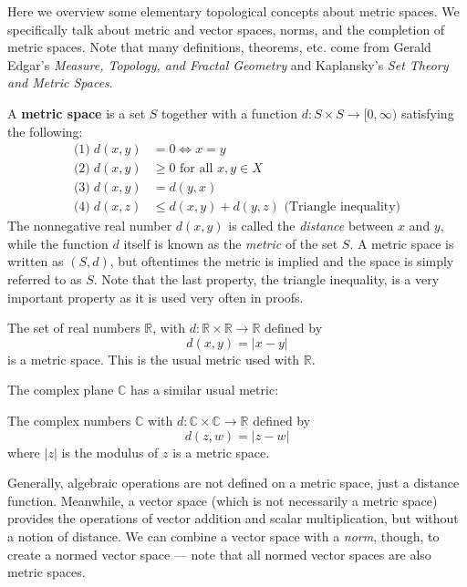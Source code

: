 Here we overview some elementary topological concepts about metric spaces.  We specifically talk about metric and vector spaces, norms, and the completion of metric spaces.  Note that many definitions, theorems, etc. come from Gerald Edgar's \textit{Measure, Topology, and Fractal Geometry}\cite{Edgar} and Kaplansky's \textit{Set Theory and Metric Spaces}\cite{Kaplansky}.

\begin{defn}
A \textbf{metric space} is a set $S$ together with a function $d:S \times S \rightarrow [0, \infty)$ satisfying the following:
\begin{align*}
\textrm{(1)}\; d(x,y) &= 0 \Leftrightarrow x = y\\
\textrm{(2)}\; d(x,y) &\geq 0 \textrm{ for all } x,y \in X\\
\textrm{(3)}\; d(x,y) &= d(y,x)\\
\textrm{(4)}\; d(x,z) &\leq d(x,y) + d(y,z) \textrm{ (Triangle inequality)}
\end{align*}
The nonnegative real number $d(x,y)$ is called the \textit{distance} between $x$ and $y$, while the function $d$ itself is known as the \textit{metric} of the set $S$.  A metric space is written as $(S, d)$, but oftentimes the metric is implied and the space is simply referred to as $S$.  Note that the last property, the triangle inequality, is a very important property as it is used very often in proofs.
\end{defn}

\begin{example}
The set of real numbers $\mathbb{R}$, with $d: \mathbb{R} \times \mathbb{R} \rightarrow \mathbb{R}$ defined by
\[d(x,y) = |x - y| \]
is a metric space.  This is the usual metric used with $\mathbb{R}$.
\end{example}

The complex plane $\mathbb{C}$ has a similar usual metric:

\begin{example}
The complex numbers $\mathbb{C}$ with $d: \mathbb{C} \times \mathbb{C} \rightarrow \mathbb{R}$ defined by
\[d(z,w) = |z - w| \]
where $|z|$ is the modulus of $z$ is a metric space.
\end{example}

Generally, algebraic operations are not defined on a metric space, just a distance function.  Meanwhile, a vector space (which is not necessarily a metric space) provides the operations of vector addition and scalar multiplication, but without a notion of distance.  We can combine a vector space with a \textit{norm}, though, to create a normed vector space --- note that all normed vector spaces are also metric spaces.

